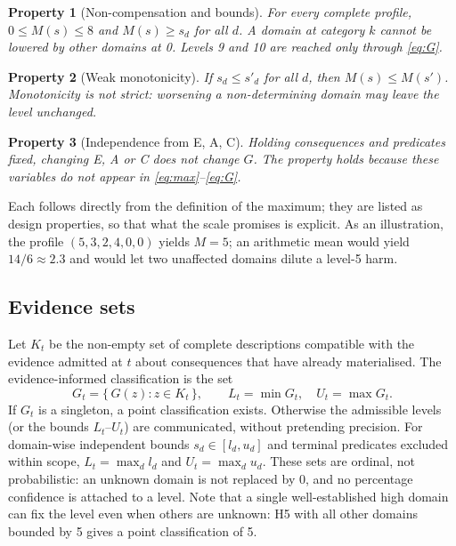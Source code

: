 \documentclass[11pt,a4paper]{article}
\newtheorem{proposition}{Property}
\begin{document}
\begin{proposition}[Non-compensation and bounds]
For every complete profile, $0 \le M(s) \le 8$ and $M(s) \ge s_d$ for all $d$. A domain at category $k$ cannot be lowered by other domains at 0. Levels 9 and 10 are reached only through \eqref{eq:G}.
\end{proposition}

\begin{proposition}[Weak monotonicity]
If $s_d \le s'_d$ for all $d$, then $M(s) \le M(s')$. Monotonicity is not strict: worsening a non-determining domain may leave the level unchanged.
\end{proposition}

\begin{proposition}[Independence from E, A, C]
Holding consequences and predicates fixed, changing E, A or C does not change $G$. The property holds because these variables do not appear in \eqref{eq:max}--\eqref{eq:G}.
\end{proposition}

Each follows directly from the definition of the maximum; they are listed as design properties, so that what the scale promises is explicit. As an illustration, the profile $(5,3,2,4,0,0)$ yields $M=5$; an arithmetic mean would yield $14/6 \approx 2.3$ and would let two unaffected domains dilute a level-5 harm.

\subsection{Evidence sets}
\label{sec:evidence}

Let $K_t$ be the non-empty set of complete descriptions compatible with the evidence admitted at $t$ about consequences that have already materialised. The evidence-informed classification is the set
\begin{equation}
G_t = \{\, G(z) : z \in K_t \,\}, \qquad L_t = \min G_t,\quad U_t = \max G_t .
\end{equation}
If $G_t$ is a singleton, a point classification exists. Otherwise the admissible levels (or the bounds $L_t$--$U_t$) are communicated, without pretending precision. For domain-wise independent bounds $s_d \in [l_d, u_d]$ and terminal predicates excluded within scope, $L_t = \max_d l_d$ and $U_t = \max_d u_d$. These sets are ordinal, not probabilistic: an unknown domain is not replaced by 0, and no percentage confidence is attached to a level. Note that a single well-established high domain can fix the level even when others are unknown: H5 with all other domains bounded by 5 gives a point classification of 5.
\end{document}
